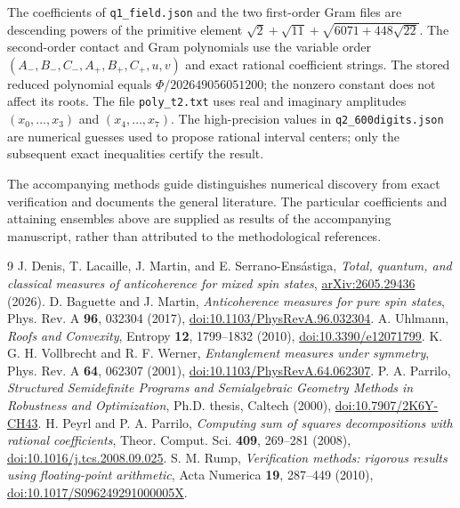 \documentclass[11pt]{article}
\begin{document}
The coefficients of \texttt{q1\_field.json} and the two first-order Gram files are descending powers of the primitive element $\sqrt2+\sqrt{11}+\sqrt{6071+448\sqrt{22}}$. The second-order contact and Gram polynomials use the variable order $(A_-,B_-,C_-,A_+,B_+,C_+,u,v)$ and exact rational coefficient strings. The stored reduced polynomial equals $\Phi/202649056051200$; the nonzero constant does not affect its roots. The file \texttt{poly\_t2.txt} uses real and imaginary amplitudes $(x_0,\ldots,x_3)$ and $(x_4,\ldots,x_7)$. The high-precision values in \texttt{q2\_600digits.json} are numerical guesses used to propose rational interval centers; only the subsequent exact inequalities certify the result.

The accompanying methods guide distinguishes numerical discovery from exact verification and documents the general literature. The particular coefficients and attaining ensembles above are supplied as results of the accompanying manuscript, rather than attributed to the methodological references.
\begin{thebibliography}{9}
 J. Denis, T. Lacaille, J. Martin, and E. Serrano-Ens\'astiga, \emph{Total, quantum, and classical measures of anticoherence for mixed spin states}, \href{https://arxiv.org/abs/2605.29436}{arXiv:2605.29436} (2026).
 D. Baguette and J. Martin, \emph{Anticoherence measures for pure spin states}, Phys. Rev. A \textbf{96}, 032304 (2017), \href{https://doi.org/10.1103/PhysRevA.96.032304}{doi:10.1103/PhysRevA.96.032304}.
 A. Uhlmann, \emph{Roofs and Convexity}, Entropy \textbf{12}, 1799--1832 (2010), \href{https://doi.org/10.3390/e12071799}{doi:10.3390/e12071799}.
 K. G. H. Vollbrecht and R. F. Werner, \emph{Entanglement measures under symmetry}, Phys. Rev. A \textbf{64}, 062307 (2001), \href{https://doi.org/10.1103/PhysRevA.64.062307}{doi:10.1103/PhysRevA.64.062307}.
 P. A. Parrilo, \emph{Structured Semidefinite Programs and Semialgebraic Geometry Methods in Robustness and Optimization}, Ph.D. thesis, Caltech (2000), \href{https://doi.org/10.7907/2K6Y-CH43}{doi:10.7907/2K6Y-CH43}.
 H. Peyrl and P. A. Parrilo, \emph{Computing sum of squares decompositions with rational coefficients}, Theor. Comput. Sci. \textbf{409}, 269--281 (2008), \href{https://doi.org/10.1016/j.tcs.2008.09.025}{doi:10.1016/j.tcs.2008.09.025}.
 S. M. Rump, \emph{Verification methods: rigorous results using floating-point arithmetic}, Acta Numerica \textbf{19}, 287--449 (2010), \href{https://doi.org/10.1017/S096249291000005X}{doi:10.1017/S096249291000005X}.
\end{thebibliography}
\end{document}
